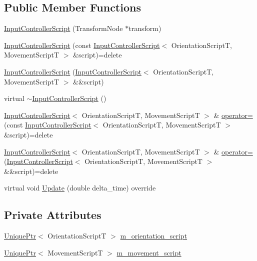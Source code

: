\subsection*{Public Member Functions}
\begin{DoxyCompactItemize}
\item 
\hyperlink{classmage_1_1_input_controller_script_adf1edb71170cb5184f201a64ad7455cb}{Input\+Controller\+Script} (Transform\+Node $\ast$transform)
\item 
\hyperlink{classmage_1_1_input_controller_script_a22de786b39180e18b8565b211797388d}{Input\+Controller\+Script} (const \hyperlink{classmage_1_1_input_controller_script}{Input\+Controller\+Script}$<$ Orientation\+ScriptT, Movement\+ScriptT $>$ \&script)=delete
\item 
\hyperlink{classmage_1_1_input_controller_script_a18b905c7a204c22173dcaf19a9587f7d}{Input\+Controller\+Script} (\hyperlink{classmage_1_1_input_controller_script}{Input\+Controller\+Script}$<$ Orientation\+ScriptT, Movement\+ScriptT $>$ \&\&script)
\item 
virtual \hyperlink{classmage_1_1_input_controller_script_ac5699d9a4d9a3f9c456885a92dede979}{$\sim$\+Input\+Controller\+Script} ()
\item 
\hyperlink{classmage_1_1_input_controller_script}{Input\+Controller\+Script}$<$ Orientation\+ScriptT, Movement\+ScriptT $>$ \& \hyperlink{classmage_1_1_input_controller_script_a747a0a1cb4064a5b8580195c0a53b887}{operator=} (const \hyperlink{classmage_1_1_input_controller_script}{Input\+Controller\+Script}$<$ Orientation\+ScriptT, Movement\+ScriptT $>$ \&script)=delete
\item 
\hyperlink{classmage_1_1_input_controller_script}{Input\+Controller\+Script}$<$ Orientation\+ScriptT, Movement\+ScriptT $>$ \& \hyperlink{classmage_1_1_input_controller_script_a2e2231433ec17577ce019348285eaba3}{operator=} (\hyperlink{classmage_1_1_input_controller_script}{Input\+Controller\+Script}$<$ Orientation\+ScriptT, Movement\+ScriptT $>$ \&\&script)=delete
\item 
virtual void \hyperlink{classmage_1_1_input_controller_script_a2b91f7c131dee5d09ac38e2878a715e3}{Update} (double delta\+\_\+time) override
\end{DoxyCompactItemize}
\subsection*{Private Attributes}
\begin{DoxyCompactItemize}
\item 
\hyperlink{namespacemage_a3316d7143a973e37adf1110f2e80ca31}{Unique\+Ptr}$<$ Orientation\+ScriptT $>$ \hyperlink{classmage_1_1_input_controller_script_ab5af05a3bf7cdd672382dd5bcb1d6d02}{m\+\_\+orientation\+\_\+script}
\item 
\hyperlink{namespacemage_a3316d7143a973e37adf1110f2e80ca31}{Unique\+Ptr}$<$ Movement\+ScriptT $>$ \hyperlink{classmage_1_1_input_controller_script_aea0478602dbabf616dd3ef8b4408a42a}{m\+\_\+movement\+\_\+script}
\end{DoxyCompactItemize}
